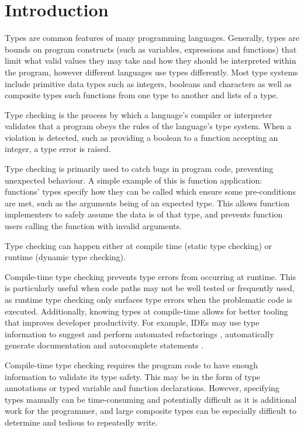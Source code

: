 \documentclass[a4paper,fleqn,oneside,12pt]{report}
\begin{document}
\tableofcontents

\chapter{Introduction}\label{id:h.6k9gcmunzldy}

Types are common features of many programming languages. Generally, types are bounds on program constructs (such as variables, expressions and functions) that limit what valid values they may take and how they should be interpreted within the program, however different languages use types differently. Most type systems include primitive data types such as integers, booleans and characters as well as composite types such functions from one type to another and lists of a type.

Type checking is the process by which a language's compiler or interpreter validates that a program obeys the rules of the language's type system. When a violation is detected, such as providing a boolean to a function accepting an integer, a type error is raised.

Type checking is primarily used to catch bugs in program code, preventing unexpected behaviour. A simple example of this is function application: functions’ types specify how they can be called which ensure some pre-conditions are met, such as the arguments being of an expected type. This allows function implementers to safely assume the data is of that type, and prevents function users calling the function with invalid arguments.

Type checking can happen either at compile time (static type checking) or runtime (dynamic type checking).

Compile-time type checking prevents type errors from occurring at runtime. This is particularly useful when code paths may not be well tested or frequently used, as runtime type checking only surfaces type errors when the problematic code is executed. Additionally, knowing types at compile-time allows for better tooling that improves developer productivity. For example, IDEs may use type information to suggest and perform automated refactorings \citep{ref1}, automatically generate documentation \citep{ref2} and autocomplete statements \citep{ref3}.

Compile-time type checking requires the program code to have enough information to validate its type safety. This may be in the form of type annotations or typed variable and function declarations. However, specifying types manually can be time-consuming and potentially difficult as it is additional work for the programmer, and large composite types can be especially difficult to determine and tedious to repeatedly write.
\end{document}
